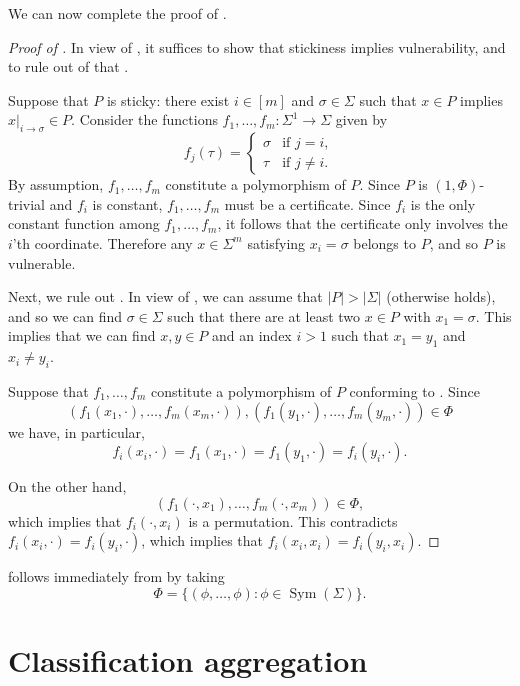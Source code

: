 \documentclass{article}
\DeclareMathOperator{\Sym}{Sym}
\theoremstyle{definition}
\theoremstyle{remark}
\begin{document}
We can now complete the proof of .
\begin{proof}[Proof of ]
In view of , it suffices to show that stickiness implies vulnerability, and to rule out  of that .

Suppose that $P$ is sticky: there exist $i \in [m]$ and $\sigma \in \Sigma$ such that $x \in P$ implies $x|_{i \to \sigma} \in P$. Consider the functions $f_1,\dots,f_m\colon \Sigma^1 \to \Sigma$ given by
\[
 f_j(\tau) =
 \begin{cases}
     \sigma & \text{if } j = i, \\
     \tau & \text{if } j \neq i.
 \end{cases}
\]
By assumption, $f_1,\dots,f_m$ constitute a polymorphism of $P$. Since $P$ is $(1,\Phi)$-trivial and $f_i$ is constant, $f_1,\dots,f_m$ must be a certificate. Since $f_i$ is the only constant function among $f_1,\dots,f_m$, it follows that the certificate only involves the $i$'th coordinate. Therefore any $x \in \Sigma^m$ satisfying $x_i = \sigma$ belongs to $P$, and so $P$ is vulnerable.

Next, we rule out .
In view of , we can assume that $|P| > |\Sigma|$ (otherwise  holds), and so we can find $\sigma \in \Sigma$ such that there are at least two $x \in P$ with $x_1 = \sigma$. This implies that we can find $x,y \in P$ and an index $i > 1$ such that $x_1 = y_1$ and $x_i \neq y_i$.

Suppose that $f_1,\dots,f_m$ constitute a polymorphism of $P$ conforming to . Since
\[
 (f_1(x_1,\cdot),\dots,f_m(x_m,\cdot)),
 (f_1(y_1,\cdot),\dots,f_m(y_m,\cdot)) \in \Phi
\]
we have, in particular,
\[
 f_i(x_i,\cdot) = f_1(x_1,\cdot) = f_1(y_1,\cdot) = f_i(y_i,\cdot).
\]

On the other hand,
\[
 (f_1(\cdot,x_1),\dots,f_m(\cdot,x_m)) \in \Phi,
\]
which implies that $f_i(\cdot,x_i)$ is a permutation. This contradicts $f_i(x_i,\cdot) = f_i(y_i,\cdot)$, which implies that $f_i(x_i,x_i) = f_i(y_i,x_i)$.
\end{proof}

 follows immediately from  by taking
\[
 \Phi = \{(\phi,\dots,\phi) : \phi \in \Sym(\Sigma)\}.
\]

\section{Classification aggregation}
\label{sec:classification}
\end{document}
